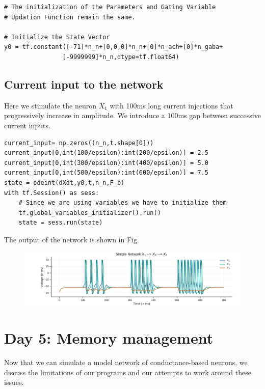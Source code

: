 \documentclass[10pt,letterpaper]{article}
\begin{document}
\begin{verbatim}
# The initialization of the Parameters and Gating Variable
# Updation Function remain the same.

# Initialize the State Vector
y0 = tf.constant([-71]*n_n+[0,0,0]*n_n+[0]*n_ach+[0]*n_gaba+
				[-9999999]*n_n,dtype=tf.float64)
\end{verbatim}

\subsection*{Current input to the network}

Here we stimulate the neuron $X_{1}$ with 100ms long current injections that progressively increase in amplitude. We introduce a 100ms gap between successive current inputs.

\begin{verbatim}
current_input= np.zeros((n_n,t.shape[0]))
current_input[0,int(100/epsilon):int(200/epsilon)] = 2.5
current_input[0,int(300/epsilon):int(400/epsilon)] = 5.0
current_input[0,int(500/epsilon):int(600/epsilon)] = 7.5
state = odeint(dXdt,y0,t,n_n,F_b)
with tf.Session() as sess:
    # Since we are using variables we have to initialize them
    tf.global_variables_initializer().run()
    state = sess.run(state)
\end{verbatim}

The output of the network is shown in Fig.
\begin{center}
\begin{figure}
\includegraphics[scale=0.4]{Figures/fig13.pdf} 

\end{figure}

\end{center}

\section*{Day 5: Memory management}
Now that we can simulate a model network of conductance-based neurons, we discuss the limitations of our programs and our attempts to work around these issues.
\end{document}
